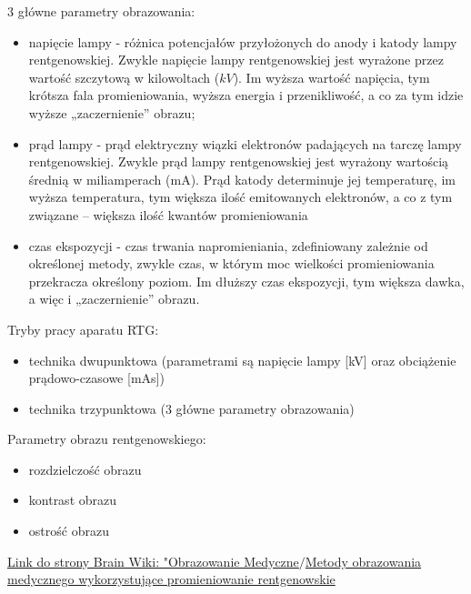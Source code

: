 \documentclass{article}
\begin{document}
3 główne parametry obrazowania:
\begin{itemize}
    \item napięcie lampy - różnica potencjałów przyłożonych do anody i katody lampy rentgenowskiej. Zwykle napięcie lampy rentgenowskiej jest wyrażone przez wartość szczytową w kilowoltach ($kV$). Im wyższa wartość napięcia, tym krótsza fala promieniowania, wyższa energia i przenikliwość, a co za tym idzie wyższe „zaczernienie” obrazu;
    \item prąd lampy - prąd elektryczny wiązki elektronów padających na tarczę lampy rentgenowskiej. Zwykle prąd lampy rentgenowskiej jest wyrażony wartością średnią w miliamperach (mA). Prąd katody determinuje jej temperaturę, im wyższa temperatura, tym większa ilość emitowanych elektronów, a co z tym związane – większa ilość kwantów promieniowania
    \item czas ekspozycji - czas trwania napromieniania, zdefiniowany zależnie od określonej metody, zwykle czas, w którym moc wielkości promieniowania przekracza określony poziom. Im dłuższy czas ekspozycji, tym większa dawka, a więc i „zaczernienie” obrazu.
\end{itemize}

Tryby pracy aparatu RTG:
\begin{itemize}
    \item technika dwupunktowa (parametrami są napięcie lampy [kV] oraz obciążenie prądowo-czasowe [mAs])
    \item technika trzypunktowa (3 główne parametry obrazowania)
\end{itemize}

Parametry obrazu rentgenowskiego:
\begin{itemize}
    \item rozdzielczość obrazu
    \item kontrast obrazu
    \item ostrość obrazu
\end{itemize}

\href{https://brain.fuw.edu.pl/edu/index.php/Obrazowanie:Obrazowanie_Medyczne/Metody_obrazowania_medycznego_wykorzystuj%C4%85ce_promieniowanie_rentgenowskie}{Link do strony Brain Wiki: "Obrazowanie Medyczne$/$Metody obrazowania medycznego wykorzystujące promieniowanie rentgenowskie}
\end{document}
